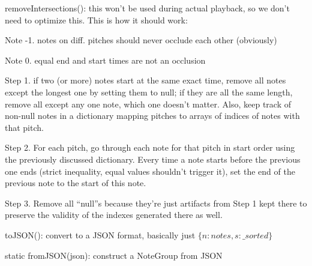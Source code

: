 \documentclass{article}
\begin{document}
removeIntersections(): this won't be used during actual playback, so we don't need to optimize this. This is how it should work:

Note -1. notes on diff. pitches should never occlude each other (obviously)

Note 0. equal end and start times are not an occlusion

Step 1. if two (or more) notes start at the same exact time, remove all notes except the longest one by setting them to null; if they are all the same length, remove all except any one note, which one doesn't matter. Also, keep track of non-null notes in a dictionary mapping pitches to arrays of indices of notes with that pitch.

Step 2. For each pitch, go through each note for that pitch in start order using the previously discussed dictionary. Every time a note starts before the previous one ends (strict inequality, equal values shouldn't trigger it), set the end of the previous note to the start of this note.

Step 3. Remove all ``null''s because they're just artifacts from Step 1 kept there to preserve the validity of the indexes generated there as well.

toJSON(): convert to a JSON format, basically just $\{n: notes, s: \_sorted\}$

static fromJSON(json): construct a NoteGroup from JSON
\end{document}
